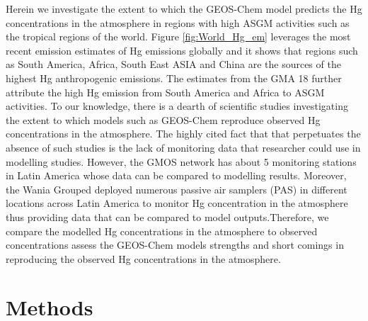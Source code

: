 \begin{flushleft}
Herein we investigate the extent to which the GEOS-Chem model predicts the Hg concentrations in the atmosphere in regions with high ASGM activities such as the tropical regions of the world. Figure \ref{fig:World_Hg_em} leverages the most recent emission estimates of Hg emissions globally and it shows that regions such as South America, Africa, South East ASIA and China are the sources of the highest Hg anthropogenic emissions. The estimates from the GMA 18 further attribute the high Hg emission from South America and Africa to ASGM activities\cite{united_nations_environment_programme_technical_2019}. To our knowledge, there is a dearth of scientific studies investigating the extent to which models such as GEOS-Chem reproduce observed Hg concentrations in the atmosphere. The highly cited fact that that perpetuates the absence of such studies is the lack of monitoring data that researcher could use in modelling studies. However, the GMOS network has about 5 monitoring stations in Latin America whose data can be compared to modelling results. Moreover, the Wania Grouped deployed numerous passive air samplers (PAS)  in different locations across Latin America to monitor Hg concentration in the atmosphere thus providing data that can be compared to model outputs.Therefore, we compare the modelled Hg concentrations in the atmosphere to observed concentrations assess the GEOS-Chem models strengths and short comings in reproducing the observed Hg concentrations in the atmosphere. 
\end{flushleft}

\section{Methods}

